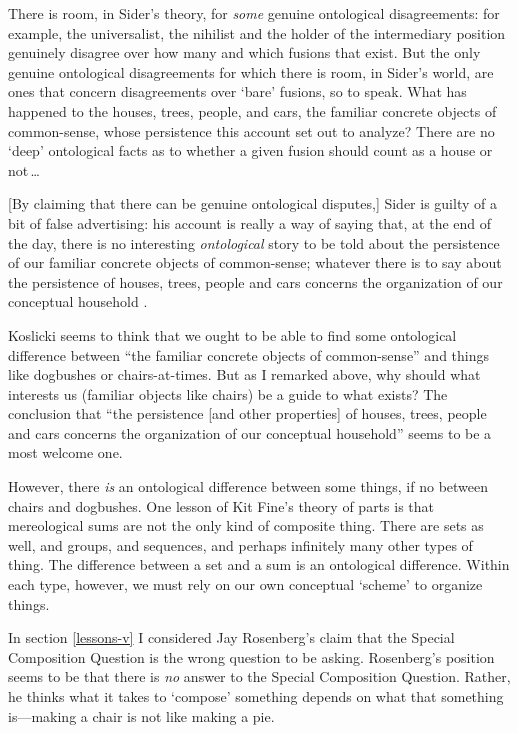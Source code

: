 \documentclass[11pt]{article}
\newenvironment{squote}{%
\begin{spacing}{1}
       	\begin{list}{}{%
\setlength{\labelwidth}{0pt}%
\rightmargin\leftmargin%
}
\item\relax
}{%
\end{list}%
\end{spacing}
}
\begin{document}
\begin{spacing}{1.25}
\begin{squote}
There is room, in Sider's theory, for {\em some} genuine ontological
disagreements: for example, the universalist, the nihilist and the
holder of the intermediary position genuinely disagree over how many
and which fusions that exist.  But the only genuine ontological
disagreements for which there is room, in Sider's world, are ones that
concern disagreements over `bare' fusions, so to speak.  What has
happened to the houses, trees, people, and cars, the familiar concrete
objects of common-sense, whose persistence this account set out to
analyze?  There are no `deep' ontological facts as to whether a given
fusion should count as a house or not\,\ldots

[By claiming that there can be genuine ontological disputes,] Sider is
guilty of a bit of false advertising: his account is really a way of
saying that, at the end of the day, there is no interesting {\em
  ontological} story to be told about the persistence of our familiar
concrete objects of common-sense; whatever there is to say about the
persistence of houses, trees, people and cars concerns the
organization of our conceptual household
\citeyearpar[124--125]{koslicki2003}.
\end{squote}

Koslicki seems to think that we ought to be able to find some
ontological difference between ``the familiar concrete objects of
common-sense'' and things like dogbushes or chairs-at-times.  But as I
remarked above, why should what interests us (familiar objects like
chairs) be a guide to what exists?  The conclusion that ``the
persistence [and other properties] of houses, trees, people and cars
concerns the organization of our conceptual household'' seems to be a
most welcome one.

However, there {\em is} an ontological difference between some things,
if no between chairs and dogbushes.  One lesson of Kit Fine's theory
of parts is that mereological sums are not the only kind of composite
thing.  There are sets as well, and groups, and sequences, and perhaps
infinitely many other types of thing.  The difference between a set
and a sum is an ontological difference.  Within each type, however,
we must rely on our own conceptual `scheme' to organize things.

In section \ref{lessons-v} I considered Jay Rosenberg's claim that
the Special Composition Question is the wrong question to be asking.
Rosenberg's position seems to be that there is {\em no} answer to the
Special Composition Question.  Rather, he thinks what it takes to
`compose' something depends on what that something is---making a chair
is not like making a pie.


\end{spacing}
\end{document}
